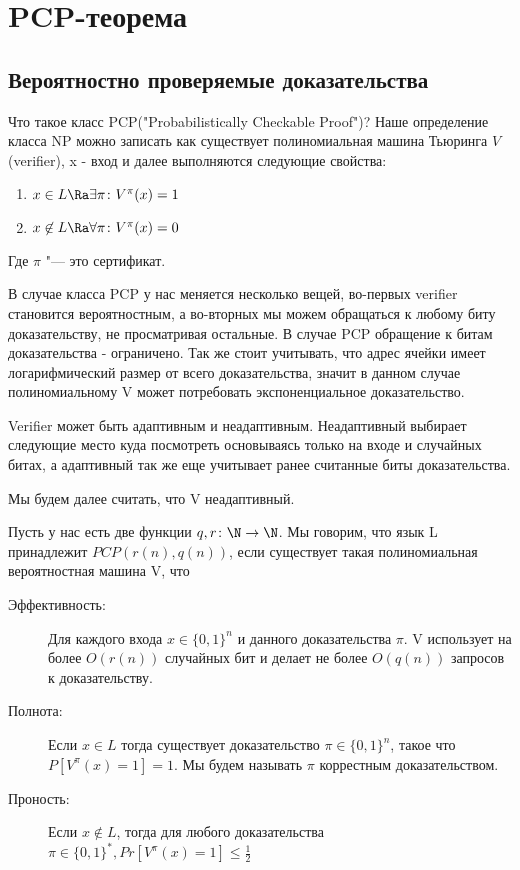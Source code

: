 ﻿\section{PCP-теорема}  
\subsection{Вероятностно проверяемые доказательства}

Что такое класс PCP("Probabilistically Checkable Proof")? 
Наше определение класса NP можно записать как существует полиномиальная 
машина Тьюринга $V$(verifier), x - вход и далее выполняются следующие свойства:
	\begin{enumerate}
	\item $x \in L \Ra \exists \pi \colon V^{\pi}(x) = 1$
	\item $x \not \in L \Ra \forall \pi \colon V^{\pi}(x) = 0$	
	\end{enumerate}
Где $\pi$ "--- это сертификат.

В случае класса PCP у нас меняется несколько вещей, во-первых verifier
становится вероятностным, а во-вторных мы можем обращаться к любому биту
доказательству, не просматривая остальные. В случае PCP обращение к битам
доказательства - ограничено. Так же стоит учитывать, что адрес ячейки
имеет логарифмический размер от всего доказательства, значит в данном
случае полиномиальному V может потребовать экспоненциальное доказательство. 

Verifier может быть адаптивным и неадаптивным. Неадаптивный выбирает 
следующие место куда посмотреть основываясь только на входе и 
случайных битах, а адаптивный так же еще учитывает ранее считанные биты
доказательства.

Мы будем далее считать, что V неадаптивный. 

\begin{Def}
   Пусть у нас есть две функции $q, r \colon \N \to \N$. Мы говорим, 
   что язык L принадлежит $PCP(r(n), q(n))$, если существует такая 
   полиномиальная вероятностная машина V, что 
   \begin{description}
   \item[Эффективность:]
   	Для каждого входа $x \in \{0, 1\}^n$ и данного 
   	доказательства $\pi$. V использует на более $O(r(n))$
   	случайных бит и делает не более $O(q(n))$ запросов
   	к доказательству. 
   \item[Полнота:]
   	Если $x \in L$ тогда существует доказательство $\pi \in \{0, 1\}^n$, 
   	такое что $P[V^{\pi}(x) = 1] = 1$. Мы будем называть $\pi$ коррестным 
   	доказательством.
   \item[Проность:]
   	Если $x \not \in L$, тогда для любого доказательства $\pi \in \{0, 1\}^*, Pr[V^{\pi}(x) = 1] \le \frac{1}{2}$ 
   \end{description}
\end{Def}

